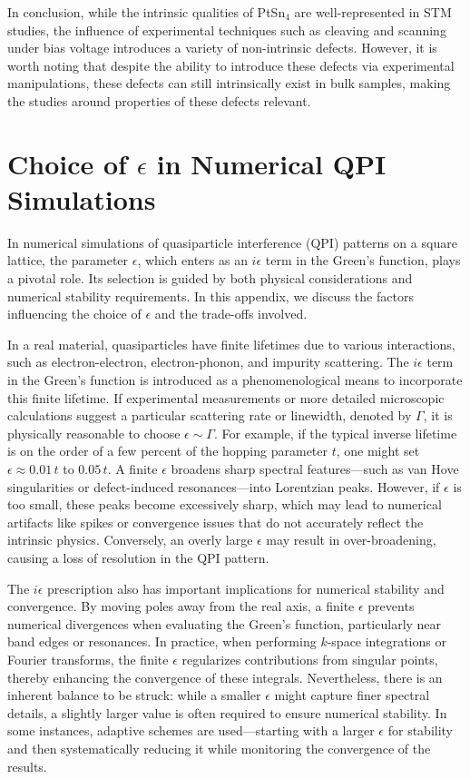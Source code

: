 \par In conclusion, while the intrinsic qualities of PtSn$_4$ are well-represented in STM studies, the influence of experimental techniques such as cleaving and scanning under bias voltage introduces a variety of non-intrinsic defects. However, it is worth noting that despite the ability to introduce these defects via experimental manipulations, these defects can still intrinsically exist in bulk samples, making the studies around properties of these defects relevant. 


\chapter{Choice of $\epsilon$ in Numerical QPI Simulations} \label{app:epsilon}

In numerical simulations of quasiparticle interference (QPI) patterns on a square lattice, the parameter $\epsilon$, which enters as an $i\epsilon$ term in the Green's function, plays a pivotal role. Its selection is guided by both physical considerations and numerical stability requirements. In this appendix, we discuss the factors influencing the choice of $\epsilon$ and the trade-offs involved.

In a real material, quasiparticles have finite lifetimes due to various interactions, such as electron-electron, electron-phonon, and impurity scattering. The $i\epsilon$ term in the Green’s function is introduced as a phenomenological means to incorporate this finite lifetime. If experimental measurements or more detailed microscopic calculations suggest a particular scattering rate or linewidth, denoted by $\Gamma$, it is physically reasonable to choose $\epsilon \sim \Gamma$. For example, if the typical inverse lifetime is on the order of a few percent of the hopping parameter $t$, one might set $\epsilon \approx 0.01\,t$ to $0.05\,t$. A finite $\epsilon$ broadens sharp spectral features—such as van Hove singularities or defect-induced resonances—into Lorentzian peaks. However, if $\epsilon$ is too small, these peaks become excessively sharp, which may lead to numerical artifacts like spikes or convergence issues that do not accurately reflect the intrinsic physics. Conversely, an overly large $\epsilon$ may result in over-broadening, causing a loss of resolution in the QPI pattern.

The $i\epsilon$ prescription also has important implications for numerical stability and convergence. By moving poles away from the real axis, a finite $\epsilon$ prevents numerical divergences when evaluating the Green's function, particularly near band edges or resonances. In practice, when performing $k$-space integrations or Fourier transforms, the finite $\epsilon$ regularizes contributions from singular points, thereby enhancing the convergence of these integrals. Nevertheless, there is an inherent balance to be struck: while a smaller $\epsilon$ might capture finer spectral details, a slightly larger value is often required to ensure numerical stability. In some instances, adaptive schemes are used—starting with a larger $\epsilon$ for stability and then systematically reducing it while monitoring the convergence of the results.


